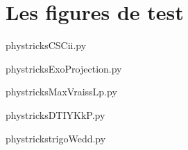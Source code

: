 \section{Les figures de test}



    \newcommand{\CaptionFigCSCii}{This is a default caption, automatically generated; do not change.}
    \begin{center}
        
    \end{center}
    phystricksCSCii.py

    

    \clearpage
    


    \newcommand{\CaptionFigExoProjection}{This is a default caption, automatically generated; do not change.}
    \begin{center}
        
    \end{center}
    phystricksExoProjection.py

    

    \clearpage
    


    \newcommand{\CaptionFigMaxVraissLp}{This is a default caption, automatically generated; do not change.}
    \begin{center}
        
    \end{center}
    phystricksMaxVraissLp.py

    

    \clearpage
    


    \newcommand{\CaptionFigDTIYKkP}{This is a default caption, automatically generated; do not change.}
    \begin{center}
        
    \end{center}
    phystricksDTIYKkP.py

    

    \clearpage
    


    \newcommand{\CaptionFigtrigoWedd}{This is a default caption, automatically generated; do not change.}
    \begin{center}
        
    \end{center}
    phystrickstrigoWedd.py

